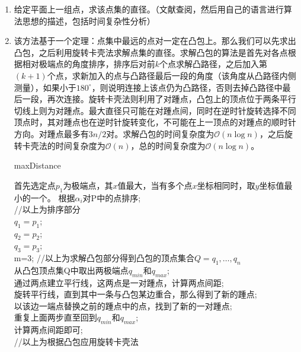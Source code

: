 \documentclass[12pt,a4paper]{article}
\makeatletter
\newtheorem*{solution}{Solution}
\theoremstyle{definition}
\renewenvironment{solution}[1][Solution] {\par\pushQED{\qed}\normalfont\topsep6\p@\@plus6\p@\relax\trivlist\item[\hskip\labelsep\bfseries#1\@addpunct{.}]\ignorespaces}{\popQED\endtrivlist\@endpefalse} \makeatother
\makeatother
\begin{document}
\begin{enumerate}
\item 给定平面上一组点，求该点集的直径。（文献查阅，然后用自己的语言进行算法思想的描述，包括时间复杂性分析）
\begin{solution}
	该方法基于一个定理：点集中最远的点对一定在凸包上。那么我们可以先求出凸包，之后利用旋转卡壳法求解点集的直径。求解凸包的算法是首先对各点根据相对极端点的角度排序，排序后对前$k$个点求解凸路径，之后加入第$(k+1)$个点，求新加入的点与凸路径最后一段的角度（该角度从凸路径内侧测量），如果小于$180^{\circ}$，则说明连接上该点仍为凸路径，否则去掉凸路径中最后一段，再次连接。旋转卡壳法则利用了对踵点，凸包上的顶点位于两条平行切线上则为对踵点。最大直径只可能在对踵点间，同时在逆时针旋转选择不同顶点时，其对踵点也在逆时针旋转变化，不可能在上一顶点的对踵点的顺时针方向。对踵点最多有$3n/2$对。求解凸包的时间复杂度为$\mathcal{O}(n\log n)$，之后旋转卡壳法的时间复杂度为$\mathcal{O}(n)$，总的时间复杂度为$\mathcal{O}(n\log n)$。
	\begin{algorithm}
		\caption{maxDistance}
		首先选定点$p_1$为极端点，其$x$值最大，当有多个点$x$坐标相同时，取$y$坐标值最小的一个。
		根据$\alpha_i$对P中的点排序;\\
		//以上为排序部分\\
		$q_1=p_1$;\\
		$q_2=p_2$;\\
		$q_3=p_3$;\\
		m=3;
		//以上为求解凸包部分得到凸包的顶点集合$Q={q_1,\ldots,q_n}$\\
		从凸包顶点集Q中取出两极端点$q_{min}$和$q_{max}$;\\
		通过两点建立平行线，这两点是一对踵点，计算两点间距;\\
		旋转平行线，直到其中一条与凸包某边重合，那么得到了新的踵点;\\
		以该边一端点替换之前的踵点中的点，找到了新的一对踵点;\\
		重复上面两步直至回到$q_{min}$和$q_{max}$;\\
		计算两点间距即可;\\
		//以上为根据凸包应用旋转卡壳法\\
	\end{algorithm}
\end{solution}


\end{enumerate}
\end{document}
